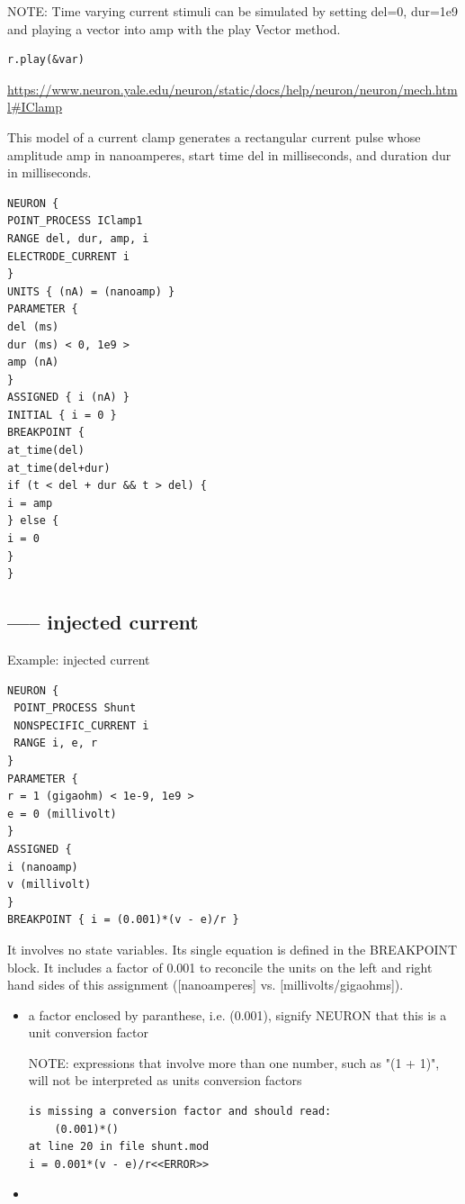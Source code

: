 NOTE: Time varying current stimuli can be simulated by setting del=0, dur=1e9
and playing a vector into amp with the play Vector method.
\begin{verbatim}
r.play(&var)
\end{verbatim}

\url{https://www.neuron.yale.edu/neuron/static/docs/help/neuron/neuron/mech.html#IClamp}

This model of a current clamp generates a rectangular current pulse whose
amplitude amp in nanoamperes, start time del in milliseconds, and duration
dur in milliseconds.

\begin{verbatim}
NEURON {
POINT_PROCESS IClamp1
RANGE del, dur, amp, i
ELECTRODE_CURRENT i
}
UNITS { (nA) = (nanoamp) }
PARAMETER {
del (ms)
dur (ms) < 0, 1e9 >
amp (nA)
}
ASSIGNED { i (nA) }
INITIAL { i = 0 }
BREAKPOINT {
at_time(del)
at_time(del+dur)
if (t < del + dur && t > del) {
i = amp
} else {
i = 0
}
}
\end{verbatim}


\subsection{----- injected current}

Example: injected current
\begin{verbatim}
NEURON {
 POINT_PROCESS Shunt
 NONSPECIFIC_CURRENT i
 RANGE i, e, r
}
PARAMETER {
r = 1 (gigaohm) < 1e-9, 1e9 >
e = 0 (millivolt)
}
ASSIGNED {
i (nanoamp)
v (millivolt)
}
BREAKPOINT { i = (0.001)*(v - e)/r }
\end{verbatim}
It involves no state variables. Its single equation is defined in the BREAKPOINT
block. It includes a factor of 0.001 to reconcile the units on the left and
right hand sides of this assignment ([nanoamperes] vs. [millivolts/gigaohms]).

\begin{itemize}

  \item a factor enclosed by paranthese, i.e. (0.001), signify NEURON that this
  is a unit conversion factor
  
  NOTE: expressions that involve more than one number, such as "(1 + 1)", will
  not be interpreted as units conversion factors

\begin{verbatim}
is missing a conversion factor and should read:
    (0.001)*()
at line 20 in file shunt.mod
i = 0.001*(v - e)/r<<ERROR>>
\end{verbatim}

  \item 
\end{itemize}


